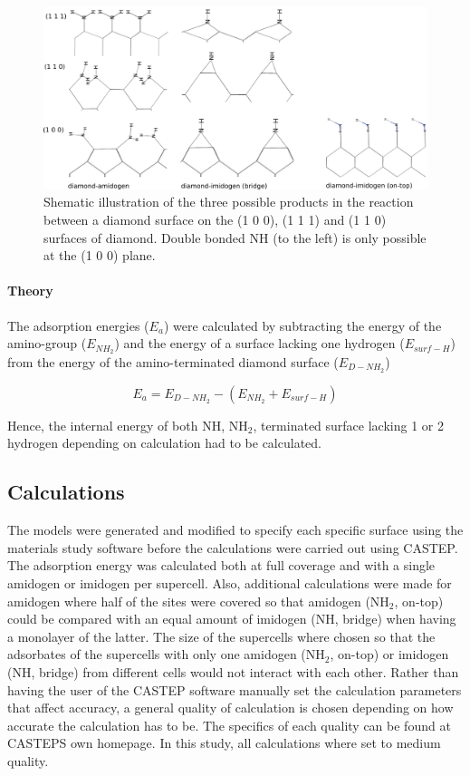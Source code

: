 \documentclass[12pt,a4paper]{article}
\begin{document}
\begin{figure} \captionsetup{width=.8\linewidth} \caption{Shematic illustration of the three possible products in the reaction between a diamond surface on the (1 0 0), (1 1 1) and (1 1 0) surfaces of diamond. Double bonded NH (to the left) is only possible at the (1 0 0) plane.} \label{products}
%
\includegraphics[width=.8\linewidth]{pictures/products_new.png}
\end{figure}






\paragraph*{Theory}
The adsorption energies ($E_a$) were calculated by subtracting the energy of the amino-group ($E_{NH_2}$) and the energy of a surface lacking one hydrogen ($E_{surf-H}$) from the energy of the amino-terminated diamond surface ($E_{D-NH_2}$)


\begin{equation} E_{a} = E_{D-NH_2}-(E_{NH_2}+E_{surf-H}) \end{equation} 

Hence, the internal energy of both NH, NH$_2$, terminated surface lacking 1 or 2 hydrogen depending on calculation had to be calculated.

\subsection{Calculations}
The models were generated and modified to specify each specific surface using the materials study software before the calculations were carried out using CASTEP. The adsorption energy was calculated both at full coverage and with a single amidogen or imidogen per supercell. Also, additional calculations were made for amidogen where half of the sites were covered so that amidogen (NH$_2$, on-top) could be compared with an equal amount of imidogen (NH, bridge) when having a monolayer of the latter. The size of the supercells where chosen so that the adsorbates of the supercells with only one amidogen (NH$_2$, on-top) or imidogen (NH, bridge) from different cells would not interact with each other. Rather than having the user of the CASTEP software manually set the calculation parameters that affect accuracy, a general quality of calculation is chosen depending on how accurate the calculation has to be. The specifics of each quality can be found at CASTEPS own homepage. In this study, all calculations where set to medium quality.
\end{document}
